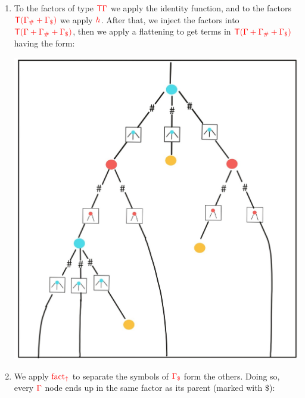 \begin{example}
\begin{enumerate}
\item To the factors of type ${\color{red}{\mathsf T}} {\color{red}{\Gamma}}$ we apply the identity function, and to the factors ${\color{red}{{\color{red}{\mathsf T}}({\color{red}{\Gamma}}_\#+{\color{red}{\Gamma}}_\$)}}$ we apply ${\color{red}{h}}$. After that, we inject the factors into ${\color{red}{{\color{red}{\mathsf T}}({\color{red}{\Gamma}}+{\color{red}{\Gamma}}_\#+{\color{red}{\Gamma}}_\$)}}$, then we apply a flattening to get terms in ${\color{red}{{\color{red}{\mathsf T}}({\color{red}{\Gamma}}+{\color{red}{\Gamma}}_\#+{\color{red}{\Gamma}}_\$)}}$ having the form:
\begin{center}
\includegraphics[scale=.15]{MyPic4.jpg}
\end{center} 
\item We apply ${\color{red}{\mathrm{fact_{\uparrow}}}}$ to separate the symbols of ${\color{red}{{\color{red}{\Gamma}}_\$}}$ form the others. Doing so, every ${\color{red}{\Gamma}}$ node ends up in the same factor as its parent (marked with $\$ $):
\begin{center}

\end{center}
\end{enumerate}
\end{example}
